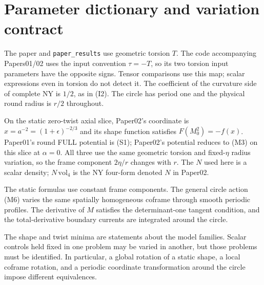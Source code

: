 \section{Parameter dictionary and variation contract}

\label{app:I}

The paper and \texttt{paper\_results} use geometric torsion $T$. The code accompanying Papers01/02 uses the input convention $\tau=-T$, so its two torsion input parameters have the opposite signs. Tensor comparisons use this map; scalar expressions even in torsion do not detect it. The coefficient of the curvature side of complete NY is $1/2$, as in (I2). The circle has period one and the physical round radius is $r/2$ throughout.

On the static zero-twist axial slice, Paper02's coordinate is $x=a^{-2}=(1+\epsilon)^{-2/3}$ and its shape function satisfies $F(M_0^2)=-f(x)$. Paper01's round FULL potential is (S1); Paper02's potential reduces to (M3) on this slice at $\alpha=0$. All three use the same geometric torsion and fixed-$\eta$ radius variation, so the frame component $2\eta/r$ changes with $r$. The $N$ used here is a scalar density; $N\,\mathrm{vol}_4$ is the NY four-form denoted $N$ in Paper02.

The static formulas use constant frame components. The general circle action (M6) varies the same spatially homogeneous coframe through smooth periodic profiles. The derivative of $M$ satisfies the determinant-one tangent condition, and the total-derivative boundary currents are integrated around the circle.

The shape and twist minima are statements about the model families. Scalar controls held fixed in one problem may be varied in another, but those problems must be identified. In particular, a global rotation of a static shape, a local coframe rotation, and a periodic coordinate transformation around the circle impose different equivalences.
